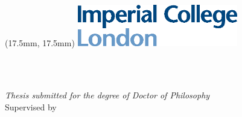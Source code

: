 \begin{titlepage}
    \begin{textblock*}{80mm}(17.5mm, 17.5mm)%
      \includegraphics[width=7cm]{gfx/imperial_logo}
    \end{textblock*} 
    \begin{center}
        \large  
        \hfill
        \vfill\vfill 

        \begingroup
            \color{Maroon}\spacedallcaps{\large{\myTitle}} \\ \bigskip
        \endgroup
        \spacedlowsmallcaps{\myName} \\ 

        \vfill\vfill

        \textit{Thesis submitted for the degree of Doctor of Philosophy} \\ 

        \vfill
        Supervised by \spacedlowsmallcaps{\myProf}\\ \medskip
        \myGroup \\
        \myDepartment \\
        \myUni \\ \bigskip

        \myTime\ %

    \end{center}  
\end{titlepage}   